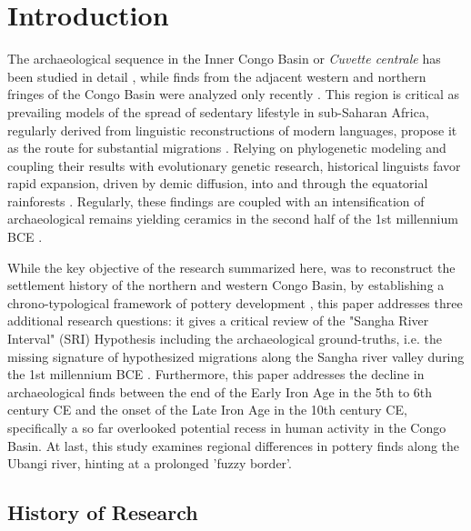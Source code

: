 \documentclass[smallextended,natbib]{svjour3}       %
\begin{document}
\begin{abstract}
\end{abstract}

\section*{Introduction}\label{intro}

The archaeological sequence in the Inner Congo Basin or \textit{Cuvette centrale} has been studied in detail \citep{Wotzka.1995}, while finds from the adjacent western and northern fringes of the Congo Basin were analyzed only recently \citep{Seidensticker.2021e}. This region is critical as prevailing models of the spread of sedentary lifestyle in sub-Saharan Africa, regularly derived from linguistic reconstructions of modern languages, propose it as the route for substantial migrations \citep{Bostoen.2018,Bostoen.2020}. Relying on phylogenetic modeling and coupling their results with evolutionary genetic research, historical linguists favor rapid expansion, driven by demic diffusion, into and through the equatorial rainforests \citep{Currie.2013,Bostoen.2015,Grollemund.2015,Koile.2022,Grollemund.2023}. Regularly, these findings are coupled with an intensification of archaeological remains yielding ceramics in the second half of the 1st millennium BCE \citep{deSaulieu.2021a,Seidensticker.2021}.

While the key objective of the research summarized here, was to reconstruct the settlement history of the northern and western Congo Basin, by establishing a chrono-typological framework of pottery development \citep{Seidensticker.2021e}, this paper addresses three additional research questions: it gives a critical review of the "Sangha River Interval" (SRI) Hypothesis including the archaeological ground-truths, i.e. the missing signature of hypothesized migrations along the Sangha river valley during the 1st millennium BCE \citep{Currie.2013,Bostoen.2015,Grollemund.2015,Koile.2022,Grollemund.2023}. Furthermore, this paper addresses the decline in archaeological finds between the end of the Early Iron Age in the 5th to 6th century CE and the onset of the Late Iron Age in the 10th century CE, specifically a so far overlooked potential recess in human activity in the Congo Basin. At last, this study examines regional differences in pottery finds along the Ubangi river, hinting at a prolonged 'fuzzy border'.

\subsection*{History of Research}
\end{document}
